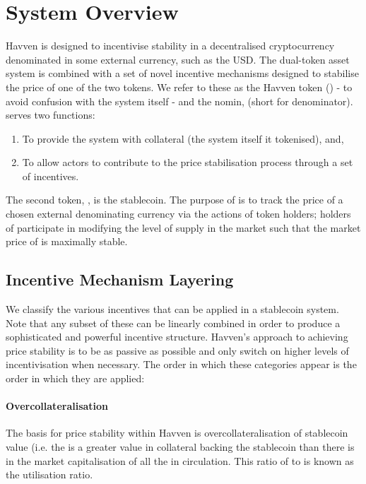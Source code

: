 
\section{System Overview} Havven is designed to incentivise stability in a decentralised cryptocurrency denominated in some external currency, such as the USD. The dual-token asset system is combined with a set of novel incentive mechanisms designed to stabilise the price of one of the two tokens. We refer to these as the Havven token (\HAV{}) - to avoid confusion with the system itself - and the nomin, \NOM{} (short for denominator). \\

\noindent \HAV{} serves two functions:

\begin{enumerate}
\item{To provide the system with collateral (the system itself it tokenised), and,}
\item{To allow actors to contribute to the price stabilisation process through a set of incentives.}
\end{enumerate}

\noindent The second token, \NOM{}, is the stablecoin. The purpose of \NOM{} is to track the price of a chosen external denominating currency via the actions of \HAV{} token holders; holders of \HAV{} participate in modifying the level of supply in the \NOM{} market such that the market price of \NOM{} is maximally stable.

\subsection{Incentive Mechanism Layering}

We classify the various incentives that can be applied in a stablecoin system. Note that any subset of these can be linearly combined in order to produce a sophisticated and powerful incentive structure. Havven's approach to achieving price stability is to be as passive as possible and only switch on higher levels of incentivisation when necessary. The order in which these categories appear is the order in which they are applied:

\paragraph{Overcollateralisation}

The basis for price stability within Havven is overcollateralisation of stablecoin value (i.e. the is a greater value in collateral backing the stablecoin than there is in the market capitalisation of all the \NOM{} in circulation. This ratio of \NOM{} to \HAV{} is known as the utilisation ratio.

